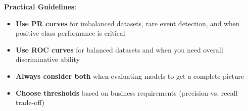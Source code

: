 \textbf{Practical Guidelines}:
\begin{itemize}
	\item \textbf{Use PR curves} for imbalanced datasets, rare event detection, and when positive class performance is critical
	\item \textbf{Use ROC curves} for balanced datasets and when you need overall discriminative ability
	\item \textbf{Always consider both} when evaluating models to get a complete picture
	\item \textbf{Choose thresholds} based on business requirements (precision vs. recall trade-off)
\end{itemize}


